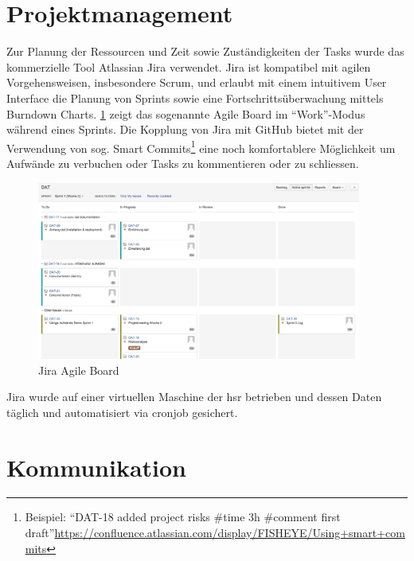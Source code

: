 \section{Projektmanagement}

Zur Planung der Ressourcen und Zeit sowie Zuständigkeiten der Tasks wurde das kommerzielle Tool Atlassian Jira verwendet. Jira ist kompatibel mit agilen Vorgehensweisen, insbesondere Scrum, und erlaubt mit einem intuitivem User Interface die Planung von Sprints sowie eine Fortschrittsüberwachung mittels Burndown Charts. \cref{fig:pm:jira-agile} zeigt das sogenannte Agile Board im ``Work''-Modus während eines Sprints. Die Kopplung von Jira mit GitHub bietet mit der Verwendung von sog. Smart Commits\footnote{Beispiel: ``DAT-18 added project risks \#time 3h \#comment first draft''\newline\url{https://confluence.atlassian.com/display/FISHEYE/Using+smart+commits}} eine noch komfortablere Möglichkeit um Aufwände zu verbuchen oder Tasks zu kommentieren oder zu schliessen.

\begin{figure}[H]
	\centering
	\includegraphics[width=0.95\textwidth]{fig/jira-agile}
	\caption{Jira Agile Board}
	\label{fig:pm:jira-agile}
\end{figure}

Jira wurde auf einer virtuellen Maschine der \acs{hsr} betrieben und dessen Daten täglich und automatisiert via cronjob gesichert.

\section{Kommunikation}

